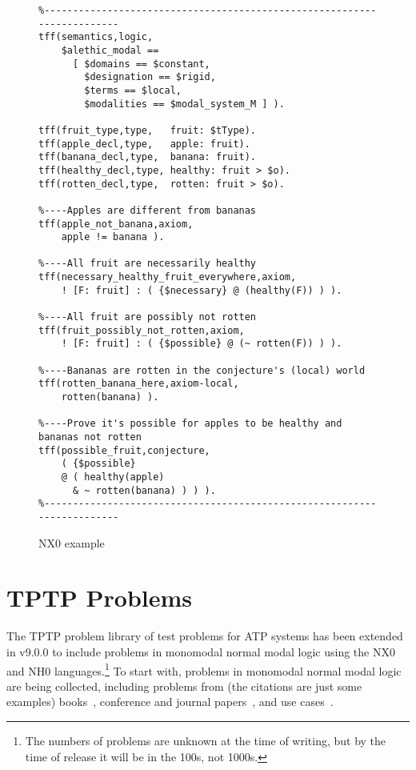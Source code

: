 \documentclass{ceurart}
\begin{document}
\begin{figure}[h!]
\small
{}
\begin{verbatim}
%------------------------------------------------------------------------
tff(semantics,logic,
    $alethic_modal == 
      [ $domains == $constant,
        $designation == $rigid,
        $terms == $local,
        $modalities == $modal_system_M ] ).

tff(fruit_type,type,   fruit: $tType).
tff(apple_decl,type,   apple: fruit).
tff(banana_decl,type,  banana: fruit).
tff(healthy_decl,type, healthy: fruit > $o).
tff(rotten_decl,type,  rotten: fruit > $o).

%----Apples are different from bananas
tff(apple_not_banana,axiom,
    apple != banana ).

%----All fruit are necessarily healthy
tff(necessary_healthy_fruit_everywhere,axiom,
    ! [F: fruit] : ( {$necessary} @ (healthy(F)) ) ).

%----All fruit are possibly not rotten
tff(fruit_possibly_not_rotten,axiom,
    ! [F: fruit] : ( {$possible} @ (~ rotten(F)) ) ).

%----Bananas are rotten in the conjecture's (local) world
tff(rotten_banana_here,axiom-local,
    rotten(banana) ).

%----Prove it's possible for apples to be healthy and bananas not rotten
tff(possible_fruit,conjecture,
    ( {$possible}
    @ ( healthy(apple)
      & ~ rotten(banana) ) ) ).
%------------------------------------------------------------------------
\end{verbatim}
\caption{NX0 example}
\label{NX0Example}
\end{figure}

\section{TPTP Problems}
\label{TPTP}

The TPTP problem library of test problems for ATP systems has been extended in v9.0.0 to include
problems in monomodal normal modal logic using the NX0 and NH0 languages.\footnote{%
The numbers of problems are unknown at the time of writing, but by the time of release it will
be in the 100s, not 1000s.}
To start with, problems in monomodal normal modal logic are being collected, including problems 
from (the citations are just some examples)
books~\cite{For94,FM98,Gir00,Sid10}, 
conference and journal papers~\cite{Rei92,FH+98,Sto00,PN+21}, 
and 
use cases~\cite{BW14-ECAI,MR22}.
\end{document}

